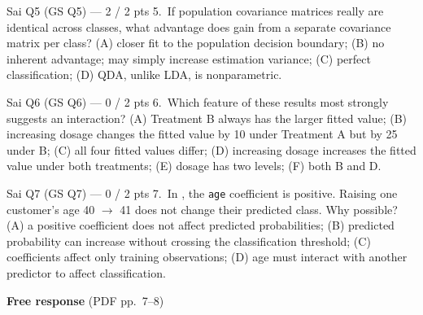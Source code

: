 \begin{qbox}{Sai Q5 (GS Q5) --- 2 / 2 pts}
5.~If population covariance matrices really are identical across classes, what advantage does  gain from a separate covariance matrix per class?
(A) closer fit to the population decision boundary; (B) no inherent advantage; may simply increase estimation variance; (C) perfect classification; (D) QDA, unlike LDA, is nonparametric.
\end{qbox}

\begin{qbox}{Sai Q6 (GS Q6) --- 0 / 2 pts}
6.~Which feature of these results most strongly suggests an interaction?
(A) Treatment B always has the larger fitted value; (B) increasing dosage changes the fitted value by 10 under Treatment A but by 25 under B; (C) all four fitted values differ; (D) increasing dosage increases the fitted value under both treatments; (E) dosage has two levels; (F) both B and D.
\end{qbox}

\begin{qbox}{Sai Q7 (GS Q7) --- 0 / 2 pts}
7.~In , the \texttt{age} coefficient is positive. Raising one customer's age 40 $\to$ 41 does not change their predicted class. Why possible?
(A) a positive coefficient does not affect predicted probabilities; (B) predicted probability can increase without crossing the classification threshold; (C) coefficients affect only training observations; (D) age must interact with another predictor to affect classification.
\end{qbox}

\textbf{Free response} (PDF pp.~7--8)

